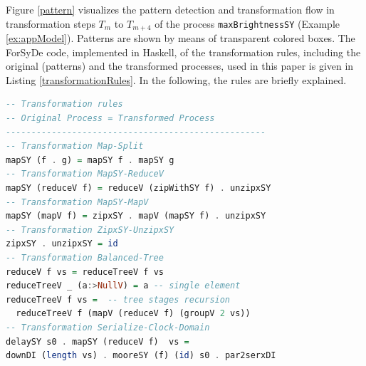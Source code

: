 \begin{exmp}\label{maxBrightness}
Figure \ref{pattern} visualizes the pattern detection and transformation flow in transformation steps $T_m$ to $T_{m+4}$ of the process \texttt{maxBrightnessSY} (Example \ref{ex:appModel}). Patterns are shown by means of transparent colored boxes. The ForSyDe code, implemented in Haskell, of the transformation rules, including the original (patterns) and the transformed processes, used in this paper is given in Listing \ref{transformationRules}. In the following, the rules are  briefly explained.  
\begin{lstlisting}[float,floatplacement=H, language=Haskell, label={transformationRules}, caption= Haskell code of the transformation rules used in this paper.]
-- Transformation rules
-- Original Process = Transformed Process
---------------------------------------------------
-- Transformation Map-Split
mapSY (f . g) = mapSY f . mapSY g
-- Transformation MapSY-ReduceV
mapSY (reduceV f) = reduceV (zipWithSY f) . unzipxSY
-- Transformation MapSY-MapV
mapSY (mapV f) = zipxSY . mapV (mapSY f) . unzipxSY
-- Transformation ZipxSY-UnzipxSY
zipxSY . unzipxSY = id
-- Transformation Balanced-Tree
reduceV f vs = reduceTreeV f vs
reduceTreeV _ (a:>NullV) = a -- single element
reduceTreeV f vs =  -- tree stages recursion
  reduceTreeV f (mapV (reduceV f) (groupV 2 vs))
-- Transformation Serialize-Clock-Domain
delaySY s0 . mapSY (reduceV f)  vs =
downDI (length vs) . mooreSY (f) (id) s0 . par2serxDI
\end{lstlisting}


\end{exmp}
